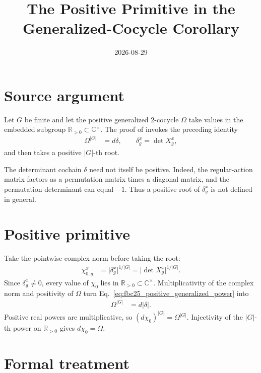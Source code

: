 \documentclass{article}
\title{The Positive Primitive in the Generalized-Cocycle Corollary}
\author{}
\date{2026-08-29}
\begin{document}
\maketitle
{}

\section{Source argument}

Let $G$ be finite and let the positive generalized $2$-cocycle $\Omega$ take
values in the embedded subgroup $\mathbb R_{>0}\subset\mathbb C^\times$.
The proof of
\cite[Corollary~\texttt{cor:positive\_trivial}, lines~5950--5960]
{FrancoRubio2025MPUGauging} invokes the preceding identity
\begin{align}
    \Omega^{|G|} &= d\delta,
    \qquad
    \delta^x_g=\det X^x_g,
    \label{eq:fbc25_positive_generalized_power}
\end{align}
and then takes a positive $|G|$-th root.

The determinant cochain $\delta$ need not itself be positive. Indeed, the
regular-action matrix factors as a permutation matrix times a diagonal matrix,
and the permutation determinant can equal $-1$. Thus a positive root of
$\delta^x_g$ is not defined in general.

\section{Positive primitive}

Take the pointwise complex norm before taking the root:
\begin{align}
    \chi^x_{0,g}
        &=\lvert\delta^x_g\rvert^{1/|G|}
          =\lvert\det X^x_g\rvert^{1/|G|}.
    \label{eq:fbc25_positive_generalized_primitive}
\end{align}
Since $\delta^x_g\ne0$, every value of $\chi_0$ lies in
$\mathbb R_{>0}\subset\mathbb C^\times$. Multiplicativity of the complex norm
and positivity of $\Omega$ turn
Eq.~\ref{eq:fbc25_positive_generalized_power} into
\begin{align}
    \Omega^{|G|} &= d\lvert\delta\rvert.
    \label{eq:fbc25_positive_generalized_norm_power}
\end{align}
Positive real powers are multiplicative, so
$(d\chi_0)^{|G|}=\Omega^{|G|}$. Injectivity of the $|G|$-th power on
$\mathbb R_{>0}$ gives $d\chi_0=\Omega$.

\section{Formal treatment}
\end{document}
